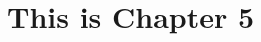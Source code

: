 \documentclass[../main/thesis.tex]{subfiles}
\begin{document}
\chapter{This is Chapter 5}
\label{ch:5}



\bib
\end{document}
